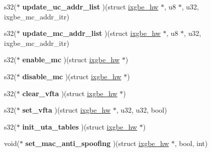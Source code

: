 \begin{DoxyCompactItemize}
\item 
\hypertarget{structixgbe__mac__operations_a1280d40089913cc41a03493f07a134e9}{
s32($\ast$ {\bfseries update\_\-uc\_\-addr\_\-list} )(struct \hyperlink{structixgbe__hw}{ixgbe\_\-hw} $\ast$, u8 $\ast$, u32, ixgbe\_\-mc\_\-addr\_\-itr)}
\label{structixgbe__mac__operations_a1280d40089913cc41a03493f07a134e9}

\item 
\hypertarget{structixgbe__mac__operations_a1f58443c51394033a7432f574b2394e0}{
s32($\ast$ {\bfseries update\_\-mc\_\-addr\_\-list} )(struct \hyperlink{structixgbe__hw}{ixgbe\_\-hw} $\ast$, u8 $\ast$, u32, ixgbe\_\-mc\_\-addr\_\-itr)}
\label{structixgbe__mac__operations_a1f58443c51394033a7432f574b2394e0}

\item 
\hypertarget{structixgbe__mac__operations_ad7648b8019b2ef98a187842bdc4b52ee}{
s32($\ast$ {\bfseries enable\_\-mc} )(struct \hyperlink{structixgbe__hw}{ixgbe\_\-hw} $\ast$)}
\label{structixgbe__mac__operations_ad7648b8019b2ef98a187842bdc4b52ee}

\item 
\hypertarget{structixgbe__mac__operations_a1dcd87eab9b38c11eee9819733ba1fed}{
s32($\ast$ {\bfseries disable\_\-mc} )(struct \hyperlink{structixgbe__hw}{ixgbe\_\-hw} $\ast$)}
\label{structixgbe__mac__operations_a1dcd87eab9b38c11eee9819733ba1fed}

\item 
\hypertarget{structixgbe__mac__operations_a279de70aa6283e66ff39448630fb192e}{
s32($\ast$ {\bfseries clear\_\-vfta} )(struct \hyperlink{structixgbe__hw}{ixgbe\_\-hw} $\ast$)}
\label{structixgbe__mac__operations_a279de70aa6283e66ff39448630fb192e}

\item 
\hypertarget{structixgbe__mac__operations_ada61ebbe17669a76ec201b9c61953733}{
s32($\ast$ {\bfseries set\_\-vfta} )(struct \hyperlink{structixgbe__hw}{ixgbe\_\-hw} $\ast$, u32, u32, bool)}
\label{structixgbe__mac__operations_ada61ebbe17669a76ec201b9c61953733}

\item 
\hypertarget{structixgbe__mac__operations_afc3e4c5e344ab0e934222df4ad09b902}{
s32($\ast$ {\bfseries init\_\-uta\_\-tables} )(struct \hyperlink{structixgbe__hw}{ixgbe\_\-hw} $\ast$)}
\label{structixgbe__mac__operations_afc3e4c5e344ab0e934222df4ad09b902}

\item 
\hypertarget{structixgbe__mac__operations_a435b8edc0ecba70dc1b985d7c23729c5}{
void($\ast$ {\bfseries set\_\-mac\_\-anti\_\-spoofing} )(struct \hyperlink{structixgbe__hw}{ixgbe\_\-hw} $\ast$, bool, int)}
\label{structixgbe__mac__operations_a435b8edc0ecba70dc1b985d7c23729c5}


\end{DoxyCompactItemize}
